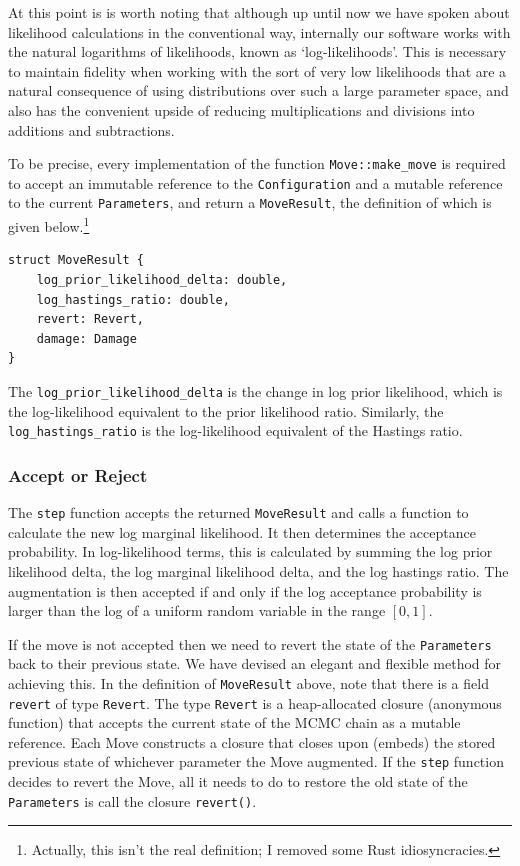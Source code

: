 \documentclass[10pt,journal,compsoc]{IEEEtran}
\begin{document}
At this point is is worth noting that although up until now we have spoken about likelihood calculations in the conventional way, internally our software works with the natural logarithms of likelihoods, known as `log-likelihoods'. This is necessary to maintain fidelity when working with the sort of very low likelihoods that are a natural consequence of using distributions over such a large parameter space, and also has the convenient upside of reducing multiplications and divisions into additions and subtractions.

To be precise, every implementation of the function \texttt{Move::make\_move} is required to accept an immutable reference to the \texttt{Configuration} and a mutable reference to the current \texttt{Parameters}, and return a \texttt{MoveResult}, the definition of which is given below.\footnote{Actually, this isn't the real definition; I removed some Rust idiosyncracies.}

\begin{verbatim}
struct MoveResult {
    log_prior_likelihood_delta: double,
    log_hastings_ratio: double,
    revert: Revert,
    damage: Damage
}
\end{verbatim}

The \texttt{log\_prior\_likelihood\_delta} is the change in log prior likelihood, which is the log-likelihood equivalent to the prior likelihood ratio. Similarly, the \texttt{log\_hastings\_ratio} is the log-likelihood equivalent of the Hastings ratio.

\subsubsection{Accept or Reject}

The \texttt{step} function accepts the returned \texttt{MoveResult} and calls a function to calculate the new log marginal likelihood. It then determines the acceptance probability. In log-likelihood terms, this is calculated by summing the log prior likelihood delta, the log marginal likelihood delta, and the log hastings ratio. The augmentation is then accepted if and only if the log acceptance probability is larger than the log of a uniform random variable in the range $[0, 1]$.

If the move is not accepted then we need to revert the state of the \texttt{Parameters} back to their previous state. We have devised an elegant and flexible method for achieving this. In the definition of \texttt{MoveResult} above, note that there is a field \texttt{revert} of type \texttt{Revert}. The type \texttt{Revert} is a heap-allocated closure (anonymous function) that accepts the current state of the MCMC chain as a mutable reference. Each Move constructs a closure that closes upon (embeds) the stored previous state of whichever parameter the Move augmented. If the \texttt{step} function decides to revert the Move, all it needs to do to restore the old state of the \texttt{Parameters} is call the closure \texttt{revert()}.
\end{document}
